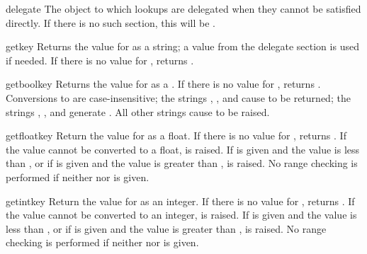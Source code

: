 \documentclass{howto}
\begin{document}
\begin{memberdesc}[Configuration]{delegate}
  The  object to which lookups are delegated when
  they cannot be satisfied directly.  If there is no such section,
  this will be .
\end{memberdesc}

\begin{methoddesc}[Configuration]{get}{key}
  Returns the value for  as a string; a value from the
  delegate section is used if needed.  If there is no value for
  , returns .
\end{methoddesc}

\begin{methoddesc}[Configuration]{getbool}{key}
  Returns the value for  as a .  If there is no
  value for , returns .  Conversions to
   are case-insensitive; the strings ,
  , and  cause  to be returned; the
  strings , , and  generate
  .  All other strings cause  to be
  raised.
\end{methoddesc}

\begin{methoddesc}[Configuration]{getfloat}{key}
  Return the value for  as a float.  If there is no
  value for , returns .  If the value cannot
  be converted to a float,  is raised.  If
   is given and the value is less than , or if
   is given and the value is greater than ,
   is raised.  No range checking is performed if
  neither  nor  is given.
\end{methoddesc}

\begin{methoddesc}[Configuration]{getint}{key}
  Return the value for  as an integer.  If there is no
  value for , returns .  If the value cannot
  be converted to an integer,  is raised.  If
   is given and the value is less than , or if
   is given and the value is greater than ,
   is raised.  No range checking is performed if
  neither  nor  is given.
\end{methoddesc}
\end{document}
